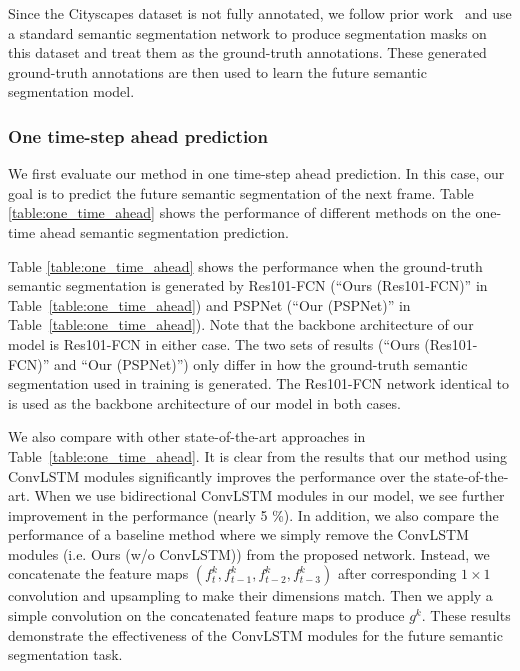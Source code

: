 \documentclass{bmvc2k}
\begin{document}
Since the Cityscapes dataset is not fully annotated, we follow prior work~\cite{NextSegmPredICCV17,jin2017predicting} and use a standard semantic segmentation network to produce segmentation masks on this dataset and treat them as the ground-truth annotations. These generated ground-truth annotations are then used to learn the future semantic segmentation model.

\subsubsection{One time-step ahead prediction}
We first evaluate our method in one time-step ahead prediction. In this case, our goal is to predict the future semantic segmentation of the next frame. Table \ref{table:one_time_ahead} shows the performance of different methods on the one-time ahead semantic segmentation prediction.

Table \ref{table:one_time_ahead} shows the performance when the ground-truth semantic segmentation is generated by Res101-FCN (``Ours (Res101-FCN)'' in Table~\ref{table:one_time_ahead}) and PSPNet (``Our (PSPNet)'' in Table~\ref{table:one_time_ahead}). Note that the backbone architecture of our model is Res101-FCN in either case. The two sets of results (``Ours (Res101-FCN)'' and ``Our (PSPNet)'') only differ in how the ground-truth semantic segmentation used in training is generated. The Res101-FCN network identical to \cite{jin2017predicting} is used as the backbone architecture of our model in both cases. 

We also compare with other state-of-the-art approaches in Table~\ref{table:one_time_ahead}. It is clear from the results that our method using ConvLSTM modules significantly improves the performance over the state-of-the-art. When we use bidirectional ConvLSTM modules in our model, we see further improvement in the performance (nearly 5 \%). In addition, we also compare the performance of a baseline method where we simply remove the ConvLSTM modules (i.e. Ours (w/o ConvLSTM)) from the proposed network. Instead, we concatenate the feature maps $(f_{t}^k, f_{t-1}^k, f_{t-2}^k, f_{t-3}^k)$ after corresponding $1\times 1$ convolution and upsampling to make their dimensions match. Then we apply a simple convolution on the concatenated feature maps to produce $g^{k}$. These results demonstrate the effectiveness of the ConvLSTM modules for the future semantic segmentation task.
 
\end{document}

